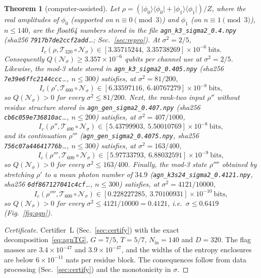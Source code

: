 \documentclass[aps,pra,reprint,superscriptaddress,nofootinbib,longbibliography,floatfix]{revtex4-2}
\newtheorem{theorem}{Theorem}
\theoremstyle{remark}
\newcommand{\ket}[1]{\lvert #1\rangle}
\newcommand{\bra}[1]{\langle #1\rvert}
\newcommand{\Ic}{I_c}
\newcommand{\Nsig}{\mathcal{N}_\sigma}
\begin{document}
\begin{theorem}[computer-assisted]
\label{thm:agn}
Let $\rho=(\ket{\phi_0}\bra{\phi_0}+\ket{\phi_1}\bra{\phi_1})/Z$, where the real amplitudes of
$\phi_0$ (supported on $n\equiv0\pmod3$) and $\phi_1$ (on $n\equiv1\pmod3$), $n\le140$, are the float64
numbers stored in the file \texttt{agn\_k3\_sigma2\_0.4.npy} (sha256 \texttt{7917b7de2ccf2add}\dots;
Sec.~\ref{sec:repro}). At
$\sigma^2=2/5$,
\begin{equation}
  \Ic(\rho,\mathcal T_{320}\circ\Nsig)\in[3.35715244,\ 3.35738269]\times10^{-6}\ \text{bits}.
\end{equation}
Consequently $Q(\Nsig)\ge3.357\times10^{-6}$ qubits per channel use at $\sigma^2=2/5$. Likewise, the
mod-3 state stored in \texttt{agn\_k3\_sigma2\_0.405.npy} (sha256 \texttt{7e39e6ffc2144ccc}\dots,
$n\le300$) satisfies, at $\sigma^2=81/200$,
\begin{equation}
  \Ic(\rho',\mathcal T_{600}\circ\Nsig)\in[6.33597116,\ 6.40767279]\times10^{-8}\ \text{bits},
\end{equation}
so $Q(\Nsig)>0$ for every $\sigma^2\le81/200$. Next, the rank-two input $\rho''$ without residue
structure stored in \texttt{agn\_gen\_sigma2\_0.407.npy} (sha256 \texttt{cb6c059e736810ac}\dots, $n\le200$)
satisfies, at $\sigma^2=407/1000$,
\begin{equation}
  \Ic(\rho'',\mathcal T_{400}\circ\Nsig)\in[5.43799903,\ 5.50010769]\times10^{-8}\ \text{bits},
\end{equation}
and its continuation $\rho'''$ (\texttt{agn\_gen\_sigma2\_0.4075.npy}, sha256 \texttt{756c07a44641776b}\dots,
$n\le300$) satisfies, at $\sigma^2=163/400$,
\begin{equation}
  \Ic(\rho''',\mathcal T_{600}\circ\Nsig)\in[5.97733793,\ 6.88032591]\times10^{-9}\ \text{bits},
\end{equation}
so $Q(\Nsig)>0$ for every $\sigma^2\le163/400$. Finally, the mod-3 state $\rho''''$ obtained by stretching
$\rho'$ to a mean photon number of $34.9$ (\texttt{agn\_k3s24\_sigma2\_0.4121.npy}, sha256
\texttt{6df867127041c4cf}\dots, $n\le300$) satisfies, at $\sigma^2=4121/10000$,
\begin{equation}
  \Ic(\rho'''',\mathcal T_{600}\circ\Nsig)\in[0.228227285,\ 3.70100931]\times10^{-10}\ \text{bits},
\end{equation}
so $Q(\Nsig)>0$ for every $\sigma^2\le4121/10000=0.4121$, i.e.\ $\sigma\le0.6419$ (Fig.~\ref{fig:agn}).
\end{theorem}

\begin{proof}[Certificate]
Certifier~L (Sec.~\ref{sec:certify}) with the exact decomposition~\eqref{eq:agnTG}, $G=7/5$, $T=5/7$,
$N_{\mathrm{in}}=140$ and $D=320$. The flag masses are $3.4\times10^{-47}$ and $3.9\times10^{-47}$, and
the widths of the entropy enclosures are below $6\times10^{-11}$ nats per residue block. The
consequences follow from data processing (Sec.~\ref{sec:certify}) and the monotonicity in $\sigma$.
\end{proof}
\end{document}
